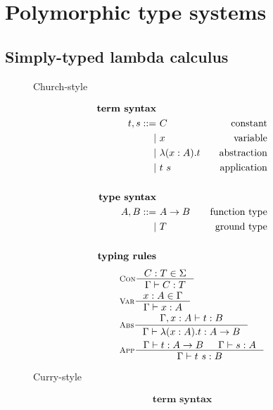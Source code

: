 \chapter{Polymorphic type systems}\label{ch:poly}

\section{Simply-typed lambda calculus}
\begin{figure}
\begin{singlespace}
\begin{minipage}{.46\textwidth}
	\begin{center}Church-style\end{center}
\small
\begin{align*}
\textbf{term syntax} \\
t,s ::= &~ C           & \text{constant}    \\
      | &~ x           & \text{variable}    \\
      | &~ \lambda(x:A) . t & \text{abstraction} \\
      | &~ t ~ s       & \text{application} \\
\\
\textbf{type syntax} \\
A,B ::= &~ A -> B  & \text{function type} \\
      | &~ T       & \text{ground type}   \\
\\
\textbf{typing rules}
\end{align*}
\vspace*{-2.5em}
\begin{align*}\qquad
& \inference[\sc Con]{C:T \in \Sigma}{\Gamma |- C:T} \\
& \inference[\sc Var]{x:A \in \Gamma}{\Gamma |- x:A} \\
& \inference[\sc Abs]{\Gamma,x:A |- t : B}{\Gamma |- \lambda(x:A).t : A -> B} \\
& \inference[\sc App]{\Gamma |- t : A -> B & \Gamma |- s : A}{\Gamma |- t~s : B} \\
\end{align*}
\end{minipage}
\begin{minipage}{.46\textwidth}
	\begin{center}Curry-style\end{center}
\small
\begin{align*}
\textbf{term syntax} \\

\end{align*}
\end{minipage}
\end{singlespace}
\end{figure}
